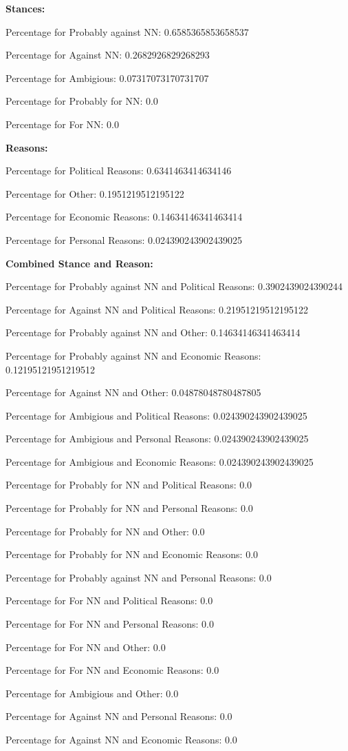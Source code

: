 \documentclass[11pt]{article}
\begin{document}
	\textbf{Stances:}
	
	Percentage for Probably against NN: 0.6585365853658537
	
	Percentage for Against NN: 0.2682926829268293
	
	Percentage for Ambigious: 0.07317073170731707
	
	Percentage for Probably for NN: 0.0
	
	Percentage for For NN: 0.0
	
	\textbf{Reasons:}
	
	Percentage for Political Reasons: 0.6341463414634146
	
	Percentage for Other: 0.1951219512195122
	
	Percentage for Economic Reasons: 0.14634146341463414
	
	Percentage for Personal Reasons: 0.024390243902439025
	
	\textbf{Combined Stance and Reason:}
	
	Percentage for Probably against NN and Political Reasons: 0.3902439024390244
	
	Percentage for Against NN and Political Reasons: 0.21951219512195122
	
	Percentage for Probably against NN and Other: 0.14634146341463414
	
	Percentage for Probably against NN and Economic Reasons: 0.12195121951219512
	
	Percentage for Against NN and Other: 0.04878048780487805
	
	Percentage for Ambigious and Political Reasons: 0.024390243902439025
	
	Percentage for Ambigious and Personal Reasons: 0.024390243902439025
	
	Percentage for Ambigious and Economic Reasons: 0.024390243902439025
	
	Percentage for Probably for NN and Political Reasons: 0.0
	
	Percentage for Probably for NN and Personal Reasons: 0.0
	
	Percentage for Probably for NN and Other: 0.0
	
	Percentage for Probably for NN and Economic Reasons: 0.0
	
	Percentage for Probably against NN and Personal Reasons: 0.0
	
	Percentage for For NN and Political Reasons: 0.0
	
	Percentage for For NN and Personal Reasons: 0.0
	
	Percentage for For NN and Other: 0.0
	
	Percentage for For NN and Economic Reasons: 0.0
	
	Percentage for Ambigious and Other: 0.0
	
	Percentage for Against NN and Personal Reasons: 0.0
	
	Percentage for Against NN and Economic Reasons: 0.0
	
\end{document}
